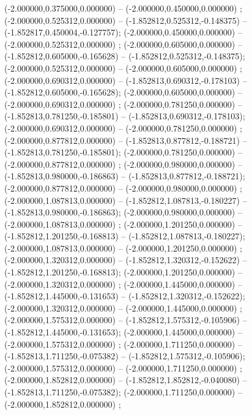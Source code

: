  (-2.000000,0.375000,0.000000) -- (-2.000000,0.450000,0.000000) ;
 (-2.000000,0.525312,0.000000) -- (-1.852812,0.525312,-0.148375) -- (-1.852817,0.450004,-0.127757);
 (-2.000000,0.450000,0.000000) -- (-2.000000,0.525312,0.000000) ;
 (-2.000000,0.605000,0.000000) -- (-1.852812,0.605000,-0.165628) -- (-1.852812,0.525312,-0.148375);
 (-2.000000,0.525312,0.000000) -- (-2.000000,0.605000,0.000000) ;
 (-2.000000,0.690312,0.000000) -- (-1.852813,0.690312,-0.178103) -- (-1.852812,0.605000,-0.165628);
 (-2.000000,0.605000,0.000000) -- (-2.000000,0.690312,0.000000) ;
 (-2.000000,0.781250,0.000000) -- (-1.852813,0.781250,-0.185801) -- (-1.852813,0.690312,-0.178103);
 (-2.000000,0.690312,0.000000) -- (-2.000000,0.781250,0.000000) ;
 (-2.000000,0.877812,0.000000) -- (-1.852813,0.877812,-0.188721) -- (-1.852813,0.781250,-0.185801);
 (-2.000000,0.781250,0.000000) -- (-2.000000,0.877812,0.000000) ;
 (-2.000000,0.980000,0.000000) -- (-1.852813,0.980000,-0.186863) -- (-1.852813,0.877812,-0.188721);
 (-2.000000,0.877812,0.000000) -- (-2.000000,0.980000,0.000000) ;
 (-2.000000,1.087813,0.000000) -- (-1.852812,1.087813,-0.180227) -- (-1.852813,0.980000,-0.186863);
 (-2.000000,0.980000,0.000000) -- (-2.000000,1.087813,0.000000) ;
 (-2.000000,1.201250,0.000000) -- (-1.852812,1.201250,-0.168813) -- (-1.852812,1.087813,-0.180227);
 (-2.000000,1.087813,0.000000) -- (-2.000000,1.201250,0.000000) ;
 (-2.000000,1.320312,0.000000) -- (-1.852812,1.320312,-0.152622) -- (-1.852812,1.201250,-0.168813);
 (-2.000000,1.201250,0.000000) -- (-2.000000,1.320312,0.000000) ;
 (-2.000000,1.445000,0.000000) -- (-1.852812,1.445000,-0.131653) -- (-1.852812,1.320312,-0.152622);
 (-2.000000,1.320312,0.000000) -- (-2.000000,1.445000,0.000000) ;
 (-2.000000,1.575312,0.000000) -- (-1.852812,1.575312,-0.105906) -- (-1.852812,1.445000,-0.131653);
 (-2.000000,1.445000,0.000000) -- (-2.000000,1.575312,0.000000) ;
 (-2.000000,1.711250,0.000000) -- (-1.852813,1.711250,-0.075382) -- (-1.852812,1.575312,-0.105906);
 (-2.000000,1.575312,0.000000) -- (-2.000000,1.711250,0.000000) ;
 (-2.000000,1.852812,0.000000) -- (-1.852812,1.852812,-0.040080) -- (-1.852813,1.711250,-0.075382);
 (-2.000000,1.711250,0.000000) -- (-2.000000,1.852812,0.000000) ;

